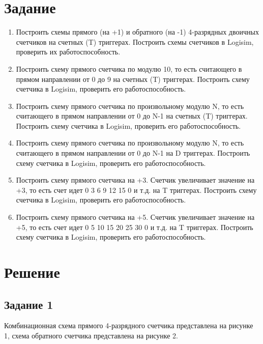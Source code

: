\documentclass[a4paper,14pt]{extarticle}
\begin{document}
  \section*{Задание}
  \begin{enumerate}
    \item Построить схемы прямого (на +1) и обратного (на -1) 4-разрядных двоичных счетчиков на счетных (T) триггерах. Построить схемы счетчиков в Logisim, проверить их работоспособность.
    
    \item Построить схему прямого счетчика по модулю 10, то есть считающего в прямом направлении от 0 до 9 на счетных (T) триггерах. Построить схему счетчика в Logisim, проверить его работоспособность.
    
    \item Построить схему прямого счетчика по произвольному модулю N, то есть считающего в прямом направлении от 0 до N-1 на счетных (T) триггерах. Построить схему счетчика в Logisim, проверить его работоспособность.
    
    \item Построить схему прямого счетчика по произвольному модулю N, то есть считающего в прямом направлении от 0 до N-1 на D триггерах. Построить схему счетчика в Logisim, проверить его работоспособность.
    
    \item Построить схему прямого счетчика на +3. Счетчик увеличивает значение на +3, то есть счет идет 0 3 6 9 12 15 0 и т.д. на T триггерах. Построить схему счетчика в Logisim, проверить его работоспособность.
    
    \item Построить схему прямого счетчика на +5. Счетчик увеличивает значение на +5, то есть счет идет 0 5 10 15 20 25 30 0 и т.д. на T триггерах. Построить схему счетчика в Logisim, проверить его работоспособность.
    
  \end{enumerate}
  
  \newpage
  \section*{Решение}
  \subsection*{Задание 1}
  Комбинационная схема прямого 4-разрядного счетчика представлена на рисунке 1, схема обратного счетчика представлена на рисунке 2.
  
\end{document}

